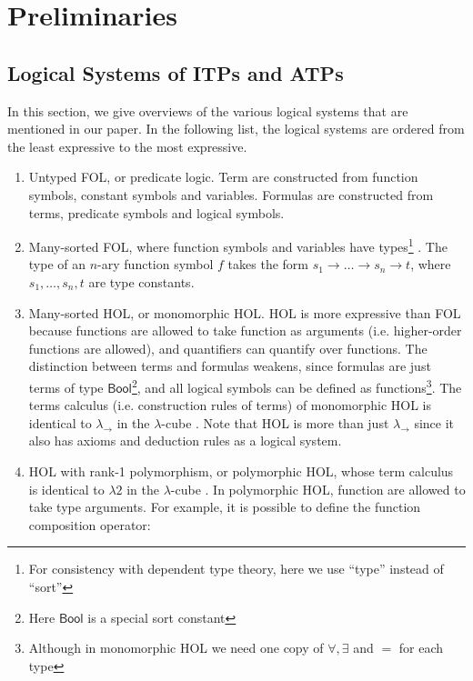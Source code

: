 \section{Preliminaries}

\subsection{Logical Systems of ITPs and ATPs}\label{sublogsys}

  In this section, we give overviews of the various logical systems
  that are mentioned in our paper. In the following list, the logical systems
  are ordered from the least expressive to the most expressive. 
  \begin{enumerate}
    \item Untyped FOL, or predicate logic. Term are constructed from
      function symbols, constant symbols and variables.
      Formulas are constructed from terms, predicate symbols and logical symbols.
    \item Many-sorted FOL, where function symbols and variables have
      types\footnote{For consistency with dependent type theory, here we use ``type'' instead of ``sort''}
      . The type of an $n$-ary function symbol $f$ takes the form
      $s_1 \to \dots \to s_n \to t$, where $s_1, \dots, s_n, t$ are type constants.
    \item Many-sorted HOL, or monomorphic HOL. HOL is more expressive than
      FOL because functions are allowed to take function as arguments
      (i.e. higher-order functions are allowed), and quantifiers can quantify over functions.
      The distinction between terms and formulas weakens, since
      formulas are just terms of type $\mathsf{Bool}$\footnote{Here $\mathsf{Bool}$ is a special sort constant}, 
      and all logical symbols can be defined as
      functions\footnote{Although in monomorphic HOL we need one copy of $\forall, \exists$ and $=$ for each type}.
      The terms calculus (i.e. construction rules of terms) of monomorphic HOL
      is identical to $\lambda_\to$ in the $\lambda$-cube \cite{LambdaWithType}.
      Note that HOL is more than just $\lambda_\to$ since it also has axioms and
      deduction rules as a logical system.
    \item HOL with rank-1 polymorphism, or polymorphic HOL, whose term calculus is identical
      to $\lambda 2$ in the $\lambda$-cube \cite{LambdaWithType}. In polymorphic HOL, function are
      allowed to take type arguments. For example, it is possible to define the function
      composition operator:

\end{enumerate}

